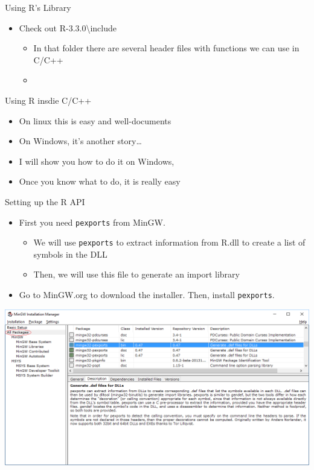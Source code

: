 \documentclass[ignorenonframetext,]{beamer}
\providecommand{\tightlist}{%
\setlength{\itemsep}{0pt}\setlength{\parskip}{0pt}}
\begin{document}
\begin{frame}{Using R's Library}

\begin{itemize}
\tightlist
\item
  Check out R-3.3.0\textbackslash{}include

  \begin{itemize}
  \item
    In that folder there are several header files with functions we can
    use in C/C++
  \item
  \end{itemize}
\end{itemize}

\end{frame}

\begin{frame}{Using R insdie C/C++}

\begin{itemize}
\tightlist
\item
  On linux this is easy and well-documents
\item
  On Windows, it's another story\ldots{}
\item
  I will show you how to do it on Windows,
\item
  Once you know what to do, it is really easy
\end{itemize}

\end{frame}

\begin{frame}[fragile]{Setting up the R API}

\begin{itemize}
\tightlist
\item
  First you need \texttt{pexports} from MinGW.

  \begin{itemize}
  \tightlist
  \item
    We will use \texttt{pexports} to extract information from R.dll to
    create a list of symbols in the DLL
  \item
    Then, we will use this file to generate an import library
  \end{itemize}
\item
  Go to MinGW.org to download the installer. Then, install
  \texttt{pexports}.
\end{itemize}

\centerline{
  \includegraphics[width=\textwidth,height=0.5\textheight,keepaspectratio]{./pexports.png}
}

\end{frame}
\end{document}
